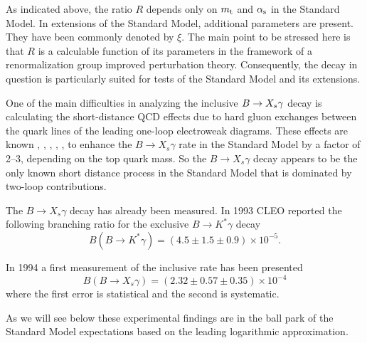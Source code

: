 As indicated above, the ratio $R$ depends only on $m_{\rm t}$ and $\alpha_{\rm s}$ in
the Standard Model. In extensions of the Standard Model, additional
parameters are present. They have been commonly denoted by $\xi$. The
main point to be stressed here is that $R$ is a calculable function of
its parameters in the framework of a renormalization group improved
perturbation theory. Consequently, the decay in question is
particularly suited for tests of the Standard Model and its extensions.

One of the main difficulties in analyzing the inclusive $B \to X_s \gamma$ decay is
calculating the short-distance QCD effects due to hard gluon exchanges
between the quark lines of the leading one-loop electroweak diagrams.
These effects are known \cite{Bert}, \cite{Desh}, \cite{Grin},
\cite{grigjanis:88}, \cite{grigjanis:92}, \cite{misiak:91} to enhance
the $B \to X_s \gamma$ rate in the Standard Model by a factor of 2--3,
depending on the top quark mass. So the $B \to X_s \gamma$ decay
appears to be the only known short distance process in the Standard
Model that is dominated by two-loop contributions.

The $B \to X_s \gamma$ decay has already been measured.  In 1993
CLEO reported \cite{CLEO:93} the following branching ratio for the
exclusive $B \to K^* \gamma$ decay
\begin{equation}
B(B \to K^* \gamma) = (4.5 \pm 1.5 \pm 0.9) \times 10^{-5}.
\label{excl}
\end{equation}

In 1994 a first measurement of the inclusive rate has been
presented \cite{CLEO:94}
\begin{equation}
B(B \to X_s\gamma) = (2.32 \pm 0.57 \pm 0.35) \times 10^{-4}
\label{incl}
\end{equation}
where the first error is statistical and the second is systematic.

As we will see below
these experimental findings are in the ball park of the Standard Model
expectations based on the leading logarithmic approximation. 

